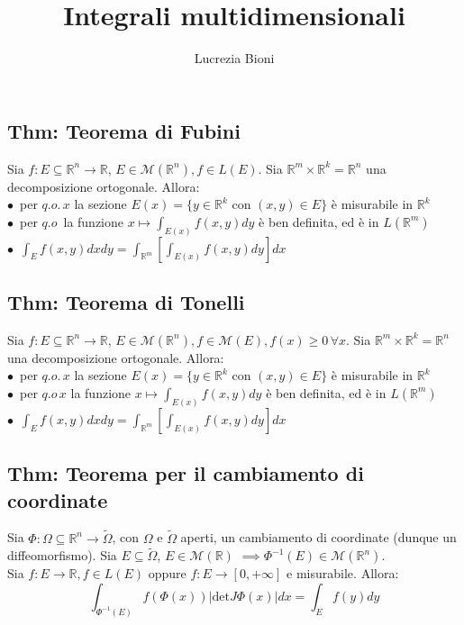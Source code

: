 \documentclass{article} %
\title{Integrali multidimensionali} %
\author{Lucrezia Bioni} %
\date{} %
\begin{document}
    \maketitle

    \subsection*{Thm: Teorema di Fubini}
    Sia $f:E \subseteq \mathbb{R}^n \to \mathbb{R}$, $E \in \mathcal{M}(\mathbb{R}^n), f \in L(E)$. Sia $\mathbb{R}^m \times \mathbb{R}^k = \mathbb{R}^n$ una decomposizione ortogonale. Allora: \\
    $\bullet \,$ per $q.o. \, x$ la sezione $E(x) = \{y \in \mathbb{R}^k$ con $(x,y) \in E \}$ è misurabile in $\mathbb{R}^k$ \\
    $\bullet \,$ per $q.o \, $ la funzione $x \mapsto \int_{E(x)} f(x,y)dy$ è ben definita, ed è in $L(\mathbb{R}^m)$ \\
    $\bullet \,$ $\int_E f(x,y) dx dy = \int_{\mathbb{R}^m} \left[\int_{E(x)} f(x,y) dy\right] dx$
  
    \subsection*{Thm: Teorema di Tonelli}
    Sia $f:E \subseteq \mathbb{R}^n \to \mathbb{R}$, $E \in \mathcal{M}(\mathbb{R}^n), f \in \mathcal{M}(E), f(x) \geq 0 \, \forall x$. Sia $\mathbb{R}^m \times \mathbb{R}^k = \mathbb{R}^n$ una decomposizione ortogonale. Allora: \\
    $\bullet \,$ per $q.o. \, x$ la sezione $E(x) = \{y \in \mathbb{R}^k$ con $(x,y) \in E \}$ è misurabile in $\mathbb{R}^k$ \\
    $\bullet \,$ per $q.o \, x$ la funzione $x \mapsto \int_{E(x)} f(x,y)dy$ è ben definita, ed è in $L(\mathbb{R}^m)$ \\
    $\bullet \,$ $\int_E f(x,y) dx dy = \int_{\mathbb{R}^m} \left[\int_{E(x)} f(x,y) dy\right] dx$


    \subsection*{Thm: Teorema per il cambiamento di coordinate}
    Sia $\Phi:\Omega \subseteq \mathbb{R}^n \to \tilde{\Omega} $, con $\Omega$ e $\tilde{\Omega}$ aperti, un cambiamento di coordinate (dunque un diffeomorfismo). Sia $E \subseteq \tilde{\Omega}$, $E \in \mathcal{M}(\mathbb{R})$ $\implies \Phi^{-1}(E) \in \mathcal{M}(\mathbb{R}^n)$.\\
    Sia $f:E \to \mathbb{R}, f \in L(E)$ oppure $f:E \to [0,+\infty]$ e misurabile. Allora:
    $$\int_{\Phi^{-1}(E)}f(\Phi (x)) \left| \text{det} J \Phi (x) \right| dx = \int_E f(y) dy$$
\end{document}
